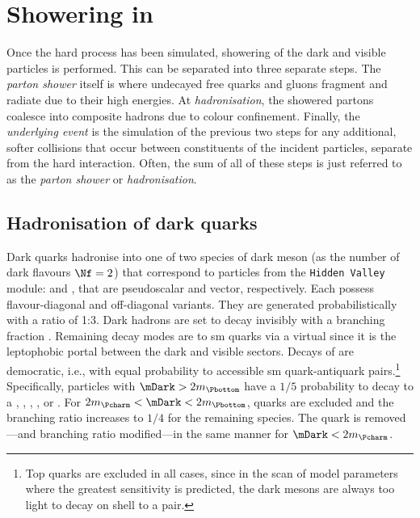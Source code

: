 \section{Showering in \texorpdfstring{\PYTHIA}{Pythia}}
\label{sec:svj_showering_pythia}

Once the hard process has been simulated, showering of the dark and visible particles is performed. This can be separated into three separate steps. The \emph{parton shower} itself is where undecayed free quarks and gluons fragment and radiate due to their high energies. At \emph{hadronisation}, the showered partons coalesce into composite hadrons due to colour confinement. Finally, the \emph{underlying event} is the simulation of the previous two steps for any additional, softer collisions that occur between constituents of the incident particles, separate from the hard interaction. Often, the sum of all of these steps is just referred to as the \emph{parton shower} or \emph{hadronisation}.




\subsection{Hadronisation of dark quarks}
\label{subsec:svj_dark_hadronisation}

Dark quarks hadronise into one of two species of dark meson (as the number of dark flavours $\Nf = \text{2}$) that correspond to particles from the \texttt{Hidden Valley} module: \Ppidark and \Prhodark, that are pseudoscalar and vector, respectively. Each possess flavour-diagonal and off-diagonal variants. They are generated probabilistically with a ratio of 1:3. Dark hadrons are set to decay invisibly with a branching fraction \rinv. Remaining decay modes are to \acrshort{sm} quarks via a virtual \PZprime since it is the leptophobic portal between the dark and visible sectors. Decays of \Prhodark are democratic, i.e., with equal probability to accessible \acrshort{sm} quark-antiquark pairs.\footnote{Top quarks are excluded in all cases, since in the scan of model parameters where the greatest sensitivity is predicted, the dark mesons are always too light to decay on shell to a \ttbar pair.} Specifically, \Prhodark particles with $\mDark > \text{2}m_{\Pbottom}$ have a $\text{1}/\text{5}$ probability to decay to a \Pup, \Pdown, \Pcharm, \Pstrange, or \Pbottom. For $\text{2}m_{\Pcharm} < \mDark < \text{2}m_{\Pbottom}$, \Pbottom quarks are excluded and the branching ratio increases to $\text{1}/\text{4}$ for the remaining species. The \Pcharm quark is removed---and branching ratio modified---in the same manner for $\mDark < \text{2}m_{\Pcharm}$.

